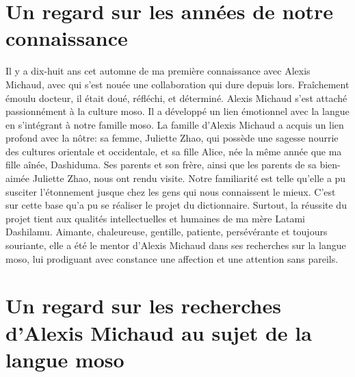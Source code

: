 \section*{Un regard sur les années de notre connaissance}

Il y a dix-huit ans cet automne de ma première connaissance avec Alexis Michaud, avec qui s’est nouée une collaboration qui dure depuis lors. Fraîchement émoulu docteur, il était doué, réfléchi, et déterminé. Alexis Michaud s’est attaché passionnément à la culture moso. Il a développé un lien émotionnel avec la langue en s'intégrant à notre famille moso. La famille d’Alexis Michaud a acquis un lien profond avec la nôtre: sa femme, Juliette Zhao, qui possède une sagesse nourrie des cultures orientale et occidentale, et sa fille Alice, née la même année que ma fille aînée, Dashiduma. Ses parents et son frère, ainsi que les parents de sa bien-aimée Juliette Zhao, nous ont rendu visite. Notre familiarité est telle qu’elle a pu susciter l’étonnement jusque chez les gens qui nous connaissent le mieux. C’est sur cette base qu’a pu se réaliser le projet du dictionnaire. Surtout, la réussite du projet tient aux qualités intellectuelles et humaines de ma mère Latami Dashilamu. Aimante, chaleureuse, gentille, patiente, persévérante et toujours souriante, elle a été le mentor d’Alexis Michaud dans ses recherches sur la langue moso, lui prodiguant avec constance une affection et une attention sans pareils.

\section*{Un regard sur les recherches d’Alexis Michaud au sujet de la langue moso}

